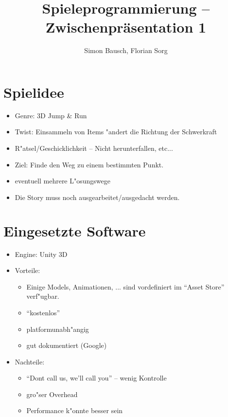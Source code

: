 \documentclass[landscape,compress,table]{beamer}
\title{Spieleprogrammierung -- Zwischenpräsentation 1}
\author{Simon Bausch, Florian Sorg}
\institute{Hochschule Aalen}
\begin{document}
\begin{frame}
	\titlepage
\end{frame}

\begin{frame}
	\tableofcontents
\end{frame}

\section{Spielidee}
\begin{frame}
	\begin{itemize}
		\item
			Genre: 3D Jump \& Run
		\item
			Twist: Einsammeln von Items "andert die
			Richtung der Schwerkraft
		\item
			R"atsel/Geschicklichkeit -- Nicht herunterfallen, etc...
		\item
			Ziel: Finde den Weg zu einem bestimmten Punkt.
		\item
			eventuell mehrere L"osungswege
		\item
			Die Story muss noch ausgearbeitet/ausgedacht werden.
	\end{itemize}
\end{frame}

\section{Eingesetzte Software}
\begin{frame}
	\begin{itemize}
		\item Engine: Unity 3D
		\item Vorteile:
			\begin{itemize}
				\item
					Einige Models, Animationen, ...
					sind vordefiniert im ``Asset Store''
					verf"ugbar.
				\item ``kostenlos''
				\item platformunabh"angig
				\item gut dokumentiert (Google)
			\end{itemize}
		\item Nachteile:
			\begin{itemize}
				\item ``Dont call us, we'll call you'' -- wenig Kontrolle
				\item gro"ser Overhead
				\item Performance k"onnte besser sein
			\end{itemize}
	\end{itemize}
\end{frame}
\end{document}
